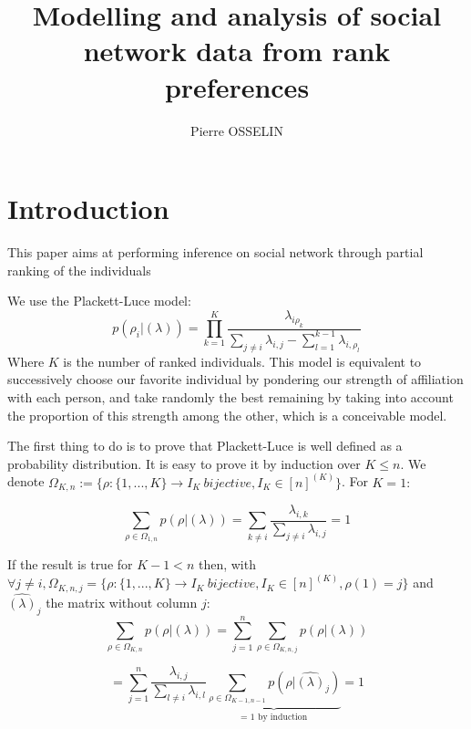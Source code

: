 \documentclass[12pt]{ociamthesis}  %
\title{Modelling and analysis of social network data from rank preferences     %
	}   %
\author{Pierre OSSELIN}             %
\begin{document}
	
	
	\maketitle                  %
	
	
	
	\chapter{Introduction}
	This paper aims at performing inference on social network through partial ranking of the individuals
	
	We use the Plackett-Luce model: 
	\begin{equation}
		p(\rho_{i} | (\lambda)) = \prod_{k = 1}^{K}\frac{\lambda_{i\rho_{k}}}{\sum_{j \neq i}\lambda_{i,j} - \sum_{l = 1}^{k - 1}\lambda_{i,\rho_{l}}}
	\end{equation}
	Where $K$ is the number of ranked individuals. This model is equivalent to successively choose our favorite individual by pondering our strength of affiliation with each person, and take randomly the best remaining by taking into account the proportion of this strength among the other, which is a conceivable model.
	
	The first thing to do is to prove that Plackett-Luce is well defined as a probability distribution. It is easy to prove it by induction over $K \leq n$. We denote $\Omega_{K,n} := \{ \rho : \{1,...,K\} \rightarrow I_{K} \ bijective, I_{K} \in [n]^{(K)}  \}$. For $K = 1 :$
	
	\begin{equation}
	\sum_{\rho \in \Omega_{1,n} }p(\rho | (\lambda)) = \sum_{k \neq i}\frac{\lambda_{i,k}}{\sum_{j \neq i}\lambda_{i,j}} = 1
	\end{equation}
	
	If the result is true for $K - 1 < n$ then, with $\forall j \neq i, \Omega_{K,n,j} = \{ \rho : \{1,...,K\} \rightarrow I_{K} \ bijective, I_{K} \in [n]^{(K)}, \rho(1) = j\}$ and $\hat{(\lambda)}_{j}$ the matrix without column $j$:
	\begin{equation}
	\sum_{\rho \in \Omega_{K,n} }p(\rho | (\lambda)) = \sum_{j = 1}^{n} \sum_{\rho \in \Omega_{K,n,j}}p(\rho | (\lambda))
	\end{equation}
	
	\begin{equation}
	= \sum_{j = 1}^{n} \frac{\lambda_{i,j}}{\sum_{l \neq i}\lambda_{i,l}} \underbrace{\sum_{\rho \in \Omega_{K-1,n-1}}p(\rho | \hat{(\lambda)}_{j})}_\text{= 1 by induction} = 1
	\end{equation}
	
\end{document}
